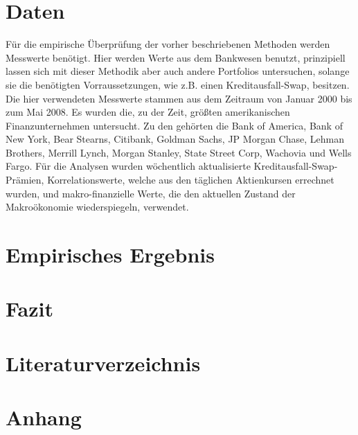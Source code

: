 \documentclass[a4paper,12pt]{scrartcl}
\begin{document}
\section{Daten}
Für die empirische Überprüfung der vorher beschriebenen Methoden werden Messwerte benötigt. Hier werden Werte aus dem Bankwesen benutzt, prinzipiell lassen sich mit dieser Methodik aber auch andere Portfolios untersuchen, solange sie die benötigten Vorraussetzungen, wie z.B. einen Kreditausfall-Swap, besitzen. 
Die hier verwendeten Messwerte stammen aus dem Zeitraum von Januar 2000 bis zum Mai 2008. Es wurden die, zu der Zeit, größten amerikanischen Finanzunternehmen untersucht. Zu den gehörten die Bank of America, Bank of New York, Bear Stearns, Citibank, Goldman Sachs, JP Morgan Chase, Lehman Brothers, Merrill Lynch, Morgan Stanley, State Street Corp, Wachovia und Wells Fargo. 
Für die Analysen wurden wöchentlich aktualisierte Kreditausfall-Swap-Prämien, Korrelationswerte, welche aus den täglichen Aktienkursen errechnet wurden, und makro-finanzielle Werte, die den aktuellen Zustand der Makroökonomie wiederspiegeln,  verwendet.

\newpage
\section{Empirisches Ergebnis}
\newpage
\section{Fazit}
\newpage
\section{Literaturverzeichnis}
\newpage

\section{Anhang}
\end{document}
